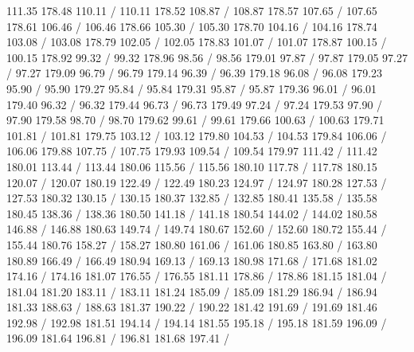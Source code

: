 { 111.35 178.48 110.11 /
 110.11 178.52 108.87 /
 108.87 178.57 107.65 /
 107.65 178.61 106.46 /
 106.46 178.66 105.30 /
 105.30 178.70 104.16 /
 104.16 178.74 103.08 /
 103.08 178.79 102.05 /
 102.05 178.83 101.07 /
 101.07 178.87 100.15 /
 100.15 178.92 99.32 /
 99.32 178.96 98.56 /
 98.56 179.01 97.87 /
 97.87 179.05 97.27 /
 97.27 179.09 96.79 /
 96.79 179.14 96.39 /
 96.39 179.18 96.08 /
 96.08 179.23 95.90 /
 95.90 179.27 95.84 /
 95.84 179.31 95.87 /
 95.87 179.36 96.01 /
 96.01 179.40 96.32 /
 96.32 179.44 96.73 /
 96.73 179.49 97.24 /
 97.24 179.53 97.90 /
 97.90 179.58 98.70 /
 98.70 179.62 99.61 /
 99.61 179.66 100.63 /
 100.63 179.71 101.81 /
 101.81 179.75 103.12 /
 103.12 179.80 104.53 /
 104.53 179.84 106.06 /
 106.06 179.88 107.75 /
 107.75 179.93 109.54 /
 109.54 179.97 111.42 /
 111.42 180.01 113.44 /
 113.44 180.06 115.56 /
 115.56 180.10 117.78 /
 117.78 180.15 120.07 /
 120.07 180.19 122.49 /
 122.49 180.23 124.97 /
 124.97 180.28 127.53 /
 127.53 180.32 130.15 /
 130.15 180.37 132.85 /
 132.85 180.41 135.58 /
 135.58 180.45 138.36 /
 138.36 180.50 141.18 /
 141.18 180.54 144.02 /
 144.02 180.58 146.88 /
 146.88 180.63 149.74 /
 149.74 180.67 152.60 /
 152.60 180.72 155.44 /
 155.44 180.76 158.27 /
 158.27 180.80 161.06 /
 161.06 180.85 163.80 /
 163.80 180.89 166.49 /
 166.49 180.94 169.13 /
 169.13 180.98 171.68 /
 171.68 181.02 174.16 /
 174.16 181.07 176.55 /
 176.55 181.11 178.86 /
 178.86 181.15 181.04 /
 181.04 181.20 183.11 /
 183.11 181.24 185.09 /
 185.09 181.29 186.94 /
 186.94 181.33 188.63 /
 188.63 181.37 190.22 /
 190.22 181.42 191.69 /
 191.69 181.46 192.98 /
 192.98 181.51 194.14 /
 194.14 181.55 195.18 /
 195.18 181.59 196.09 /
 196.09 181.64 196.81 /
 196.81 181.68 197.41 /
}

